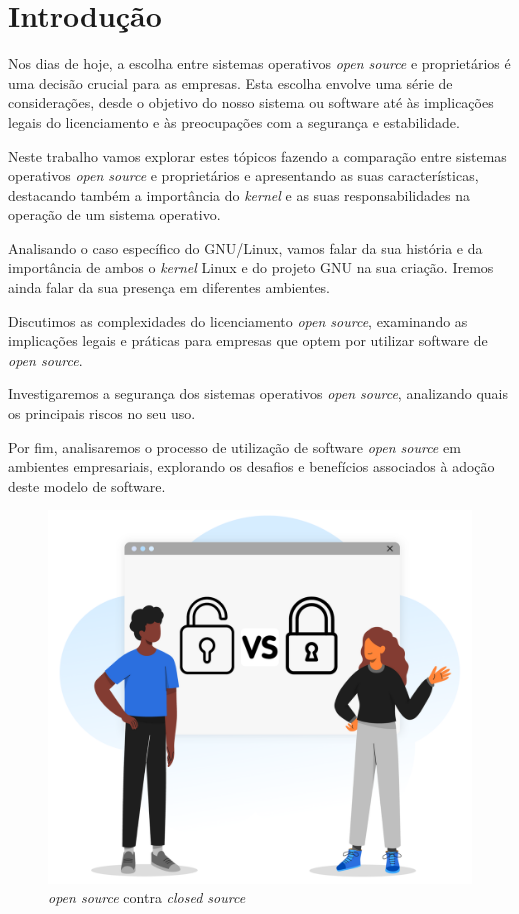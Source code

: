\section{Introdução} \label{section: Introducao}
Nos dias de hoje, a escolha entre sistemas operativos \textit{open source} e proprietários é uma decisão crucial para as empresas. Esta escolha envolve uma série de considerações, desde o objetivo do nosso sistema ou software até às implicações legais do licenciamento e às preocupações com a segurança e estabilidade.
\par \vspace{6pt}
Neste trabalho vamos explorar estes tópicos fazendo a comparação entre sistemas operativos \textit{open source} e proprietários e apresentando as suas características, destacando também a importância do \textit{kernel} e as suas responsabilidades na operação de um sistema operativo.
\par \vspace{6pt}
Analisando o caso específico do GNU/Linux, vamos falar da sua história e da importância de ambos o \textit{kernel} Linux e do projeto GNU na sua criação. Iremos ainda falar da sua presença em diferentes ambientes.
\par \vspace{6pt}
Discutimos as complexidades do licenciamento \textit{open source}, examinando as implicações legais e práticas para empresas que optem por utilizar software de \textit{open source}.
\par \vspace{6pt}
Investigaremos a segurança dos sistemas operativos \textit{open source}, analizando quais os principais riscos no seu uso. 
\par \vspace{6pt}
Por fim, analisaremos o processo de utilização de software \textit{open source} em ambientes empresariais, explorando os desafios e benefícios associados à adoção deste modelo de software.
\vspace{10pt}
\begin{figure}[H]
  \centering
  \includegraphics[scale=0.30]{Figures/0. General/open_vs_closed.png}
  \caption{\textit{open source} contra \textit{closed source}}
  \label{Open source vs. closed source}
\end{figure}